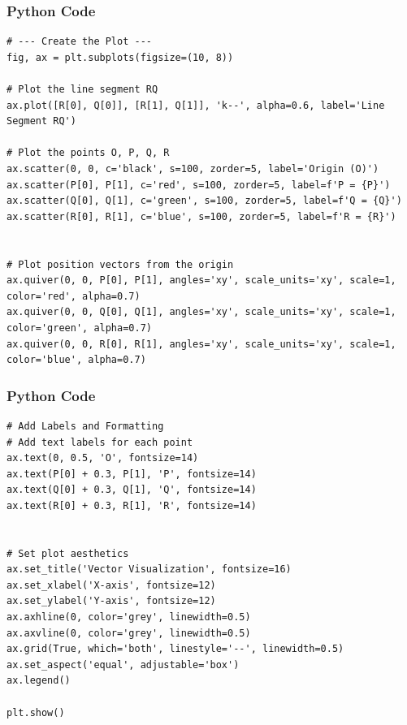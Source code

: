 \documentclass{beamer}
\begin{document}
 
\begin{frame}[fragile]
    \frametitle{Python Code}

    \begin{lstlisting}
# --- Create the Plot ---
fig, ax = plt.subplots(figsize=(10, 8))

# Plot the line segment RQ
ax.plot([R[0], Q[0]], [R[1], Q[1]], 'k--', alpha=0.6, label='Line Segment RQ')

# Plot the points O, P, Q, R
ax.scatter(0, 0, c='black', s=100, zorder=5, label='Origin (O)')
ax.scatter(P[0], P[1], c='red', s=100, zorder=5, label=f'P = {P}')
ax.scatter(Q[0], Q[1], c='green', s=100, zorder=5, label=f'Q = {Q}')
ax.scatter(R[0], R[1], c='blue', s=100, zorder=5, label=f'R = {R}')


# Plot position vectors from the origin
ax.quiver(0, 0, P[0], P[1], angles='xy', scale_units='xy', scale=1, color='red', alpha=0.7)
ax.quiver(0, 0, Q[0], Q[1], angles='xy', scale_units='xy', scale=1, color='green', alpha=0.7)
ax.quiver(0, 0, R[0], R[1], angles='xy', scale_units='xy', scale=1, color='blue', alpha=0.7)
\end{lstlisting}
\end{frame}
\begin{frame}[fragile]
    \frametitle{Python Code}

    \begin{lstlisting}
# Add Labels and Formatting 
# Add text labels for each point
ax.text(0, 0.5, 'O', fontsize=14)
ax.text(P[0] + 0.3, P[1], 'P', fontsize=14)
ax.text(Q[0] + 0.3, Q[1], 'Q', fontsize=14)
ax.text(R[0] + 0.3, R[1], 'R', fontsize=14)


# Set plot aesthetics
ax.set_title('Vector Visualization', fontsize=16)
ax.set_xlabel('X-axis', fontsize=12)
ax.set_ylabel('Y-axis', fontsize=12)
ax.axhline(0, color='grey', linewidth=0.5)
ax.axvline(0, color='grey', linewidth=0.5)
ax.grid(True, which='both', linestyle='--', linewidth=0.5)
ax.set_aspect('equal', adjustable='box')
ax.legend()

plt.show()
\end{lstlisting}
\end{frame}
\end{document}
